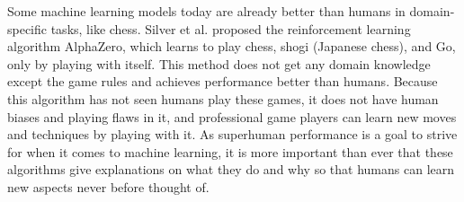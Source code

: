 Some machine learning models today are already better than humans in domain-specific tasks, like chess\cite{campbellDeepBlue2002}. Silver et al.\cite{silverGeneralReinforcementLearning2018} proposed the reinforcement learning algorithm AlphaZero, which learns to play chess, shogi (Japanese chess), and Go, only by playing with itself. This method does not get any domain knowledge except the game rules and achieves performance better than humans. Because this algorithm has not seen humans play these games, it does not have human biases and playing flaws in it, and professional game players can learn new moves and techniques by playing with it. 
As superhuman performance is a goal to strive for when it comes to machine learning, it is more important than ever that these algorithms give explanations on what they do and why so that humans can learn new aspects never before thought of.
